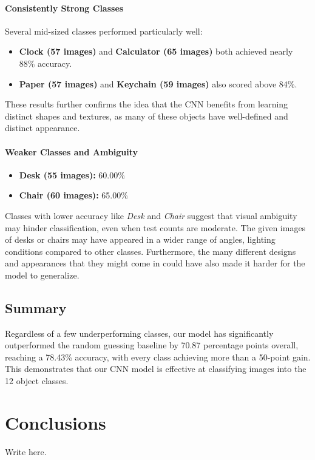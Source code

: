 \documentclass[10pt]{article}
\begin{document}
\paragraph{Consistently Strong Classes}
Several mid-sized classes performed particularly well:
\begin{itemize}
  \item \textbf{Clock (57 images)} and \textbf{Calculator (65 images)} both achieved nearly 88\% accuracy.
  \item \textbf{Paper (57 images)} and \textbf{Keychain (59 images)} also scored above 84\%.
\end{itemize}
These results further confirms the idea that the CNN benefits from learning distinct shapes and textures, as many of these objects have well-defined and distinct appearance.

\paragraph{Weaker Classes and Ambiguity}
\begin{itemize}
  \item \textbf{Desk (55 images):} 60.00\%
  \item \textbf{Chair (60 images):} 65.00\%
\end{itemize}
Classes with lower accuracy like \emph{Desk} and \emph{Chair} suggest that visual ambiguity may hinder classification, even when test counts are moderate. The given images of desks or chairs may have appeared in a wider range of angles, 
lighting conditions compared to other classes. Furthermore, the many different designs and appearances that they might come in could have also made it harder for the model to generalize.

\subsection{Summary}
Regardless of a few underperforming classes, our model has significantly outperformed the random guessing baseline by 70.87 percentage points overall, reaching a 78.43\% accuracy, with every class achieving more than a 50-point gain. 
This demonstrates that our CNN model is effective at classifying images into the 12 object classes. 





\section{Conclusions}

Write here. 




\end{document}
